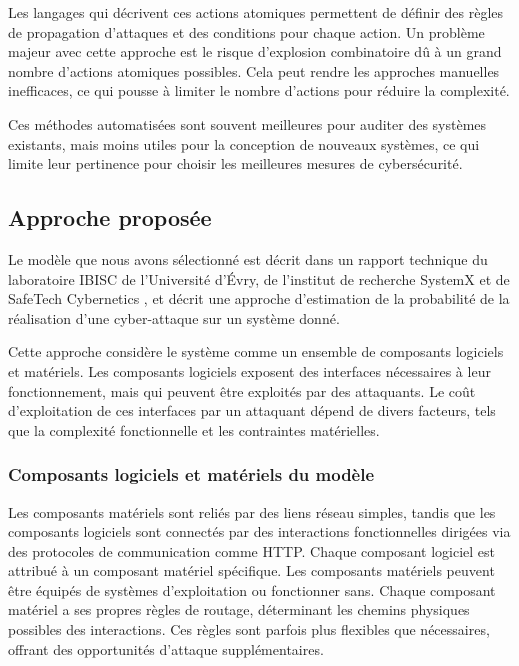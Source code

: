 \documentclass[a4paper]{article}
\begin{document}
    Les langages qui décrivent ces actions atomiques permettent de définir des règles de propagation d'attaques et des conditions pour chaque action. Un problème majeur avec cette approche est le risque d'explosion combinatoire dû à un grand nombre d'actions atomiques possibles. Cela peut rendre les approches manuelles inefficaces, ce qui pousse à limiter le nombre d'actions pour réduire la complexité.

    Ces méthodes automatisées sont souvent meilleures pour auditer des systèmes existants, mais moins utiles pour la conception de nouveaux systèmes, ce qui limite leur pertinence pour choisir les meilleures mesures de cybersécurité.

    \subsection{Approche proposée}

    Le modèle que nous avons sélectionné est décrit dans un rapport technique du laboratoire IBISC de l'Université d'Évry, de l'institut de recherche SystemX et de SafeTech Cybernetics \cite{hutzler_automatic_2024}, et décrit une approche d'estimation de la probabilité de la réalisation d'une cyber-attaque sur un système donné.
    
    Cette approche considère le système comme un ensemble de composants logiciels et matériels. Les composants logiciels exposent des interfaces nécessaires à leur fonctionnement, mais qui peuvent être exploités par des attaquants.
    Le coût d'exploitation de ces interfaces par un attaquant dépend de divers facteurs, tels que la complexité fonctionnelle et les contraintes matérielles.

    \subsubsection{Composants logiciels et matériels du modèle}

    Les composants matériels sont reliés par des liens réseau simples, tandis que les composants logiciels sont connectés par des interactions fonctionnelles dirigées via des protocoles de communication comme HTTP. 
    Chaque composant logiciel est attribué à un composant matériel spécifique. 
    Les composants matériels peuvent être équipés de systèmes d'exploitation ou fonctionner sans. Chaque composant matériel a ses propres règles de routage, déterminant les chemins physiques possibles des interactions. 
    Ces règles sont parfois plus flexibles que nécessaires, offrant des opportunités d'attaque supplémentaires.
\end{document}
